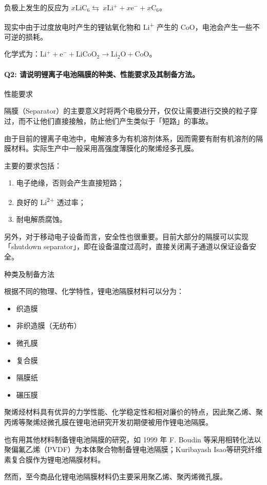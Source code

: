 \documentclass[
]{article}
\begin{document}
负极上发生的反应为
\({\displaystyle x\mathrm {LiC_{6}} \leftrightarrows \ x\mathrm {Li^{+}} +x\mathrm {e^{-}} +x\mathrm {C_{6}} }\)。

现实中由于过度放电时产生的锂钴氧化物和 Li\textsuperscript{+} 产生的
CoO，电池会产生一些不可逆的损耗。

化学式为：\({\mathrm  {Li^{+}}}+{\mathrm  {e^{-}}}+{\mathrm  {LiCoO_{2}}}\rightarrow {\mathrm  {Li_{2}O}}+{\mathrm  {CoO}}\)。

\hypertarget{header-n119}{%
\paragraph{Q2:
请说明锂离子电池隔膜的种类、性能要求及其制备方法。}\label{header-n119}}

性能要求

隔膜（Separator）的主要意义时将两个电极分开，仅仅让需要进行交换的粒子穿过，而不让他们直接接触，防止他们产生类似于「短路」的事故。

由于目前的锂离子电池中，电解液多为有机溶剂体系，因而需要有耐有机溶剂的隔膜材料。实际生产中一般采用高强度薄膜化的聚烯烃多孔膜。

主要的要求包括：

\begin{enumerate}
\def\labelenumi{\arabic{enumi}.}
\item
  电子绝缘，否则会产生直接短路；
\item
  良好的 Li\textsuperscript{2+} 透过率；
\item
  耐电解质腐蚀。
\end{enumerate}

另外，对于移动电子设备而言，安全性也很重要。目前大部分的隔膜可以实现「shutdown
separator」，即在设备温度过高时，直接关闭离子通道以保证设备安全。

种类及制备方法

根据不同的物理、化学特性，锂电池隔膜材料可以分为：

\begin{itemize}
\item
  织造膜
\item
  非织造膜（无纺布）
\item
  微孔膜
\item
  复合膜
\item
  隔膜纸
\item
  碾压膜
\end{itemize}

聚烯烃材料具有优异的力学性能、化学稳定性和相对廉价的特点，因此聚乙烯、聚丙烯等聚烯烃微孔膜在锂电池研究开发初期便被用作锂电池隔膜。

也有用其他材料制备锂电池隔膜的研究，如 1999 年 F. Boudin
等采用相转化法以聚偏氟乙烯（PVDF）为本体聚合物制备锂电池隔膜；Kuribayash
Isao等研究纤维素复合膜作为锂电池隔膜材料。

然而，至今商品化锂电池隔膜材料仍主要采用聚乙烯、聚丙烯微孔膜。
\end{document}
